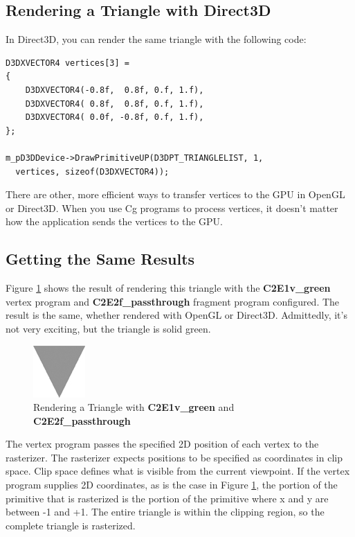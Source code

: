 \documentclass{book}
\begin{document}
\subsection{Rendering a Triangle with Direct3D}

In Direct3D, you can render the same triangle with the following code:

\FloatBarrier
\begin{lstlisting}
D3DXVECTOR4 vertices[3] =
{
    D3DXVECTOR4(-0.8f,  0.8f, 0.f, 1.f),
    D3DXVECTOR4( 0.8f,  0.8f, 0.f, 1.f),
    D3DXVECTOR4( 0.0f, -0.8f, 0.f, 1.f),
};

m_pD3DDevice->DrawPrimitiveUP(D3DPT_TRIANGLELIST, 1,
  vertices, sizeof(D3DXVECTOR4));
\end{lstlisting}
\FloatBarrier

There are other, more efficient ways to transfer vertices to the GPU in OpenGL or Direct3D. When you use Cg programs to process vertices, it doesn't matter how the application sends the vertices to the GPU.

\subsection{Getting the Same Results}

Figure \ref{fig:2-5} shows the result of rendering this triangle with the \textbf{C2E1v\_green} vertex program and \textbf{C2E2f\_passthrough} fragment program configured. The result is the same, whether rendered with OpenGL or Direct3D. Admittedly, it's not very exciting, but the triangle is solid green.

\begin{figure}
    \centering
    \includegraphics[width=0.25\linewidth]{Images/fig_0006.jpg}
    \caption{Rendering a Triangle with \textbf{C2E1v\_green} and \textbf{C2E2f\_passthrough}}
    \label{fig:2-5}
\end{figure}

The vertex program passes the specified 2D position of each vertex to the rasterizer. The rasterizer expects positions to be specified as coordinates in clip space. Clip space defines what is visible from the current viewpoint. If the vertex program supplies 2D coordinates, as is the case in Figure \ref{fig:2-5}, the portion of the primitive that is rasterized is the portion of the primitive where x and y are between -1 and +1. The entire triangle is within the clipping region, so the complete triangle is rasterized.
\end{document}

